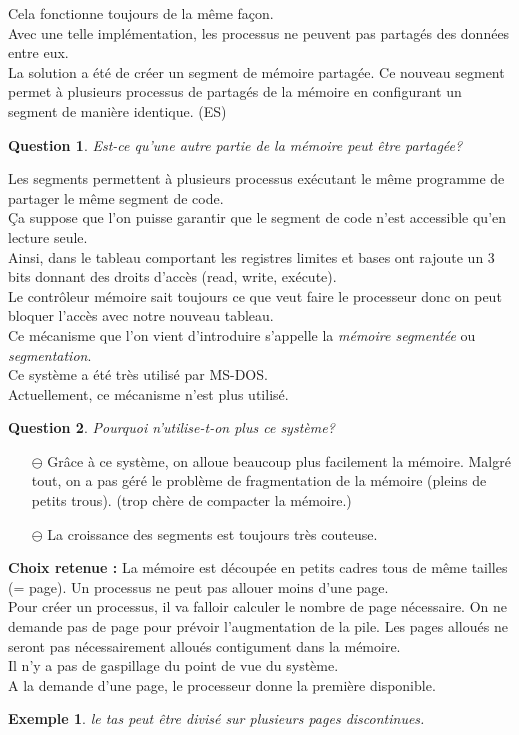 \documentclass[12pt,a4paper]{report}
\newtheorem*{ex}{Exemple}
\newtheorem*{q}{Question}
\begin{document}
Cela fonctionne toujours de la même façon.\\

Avec une telle implémentation, les processus ne peuvent pas partagés des données entre eux.\\
La solution a été de créer un segment de mémoire partagée. Ce nouveau segment permet à plusieurs processus de partagés de la mémoire en configurant un segment de manière identique. (ES)\\

\begin{q}Est-ce qu'une autre partie de la mémoire peut être partagée?\end{q}
Les segments permettent à plusieurs processus exécutant le même programme de partager le même segment de code.\\
Ça suppose que l'on puisse garantir que le segment de code n'est accessible qu'en lecture seule.\\
Ainsi, dans le tableau comportant les registres limites et bases ont rajoute un 3 bits donnant des droits d'accès (read, write, exécute).\\
Le contrôleur mémoire sait toujours ce que veut faire le processeur donc on peut bloquer l’accès avec notre nouveau tableau.\\


Ce mécanisme que l'on vient d'introduire s'appelle la \emph{mémoire segmentée} ou \emph{segmentation}.\\
Ce système a été très utilisé par MS-DOS.\\

Actuellement, ce mécanisme n'est plus utilisé.\\
\begin{q} Pourquoi n'utilise-t-on plus ce système?\end{q}
\begin{itemize}
\item[$\ominus$] Grâce à ce système, on alloue beaucoup plus facilement la mémoire. Malgré tout, on a pas géré le problème de fragmentation de la mémoire (pleins de petits trous). (trop chère de compacter la mémoire.)
\item[$\ominus$] La croissance des segments est toujours très couteuse.
\end{itemize}

\textbf{Choix retenue :} La mémoire est découpée en petits cadres tous de même tailles (= page). Un processus ne peut pas allouer moins d'une page.\\
Pour créer un processus, il va falloir calculer le nombre de page nécessaire. On ne demande pas de page pour prévoir l'augmentation de la pile. Les pages alloués ne seront pas nécessairement alloués contigument dans la mémoire.\\
Il n'y a pas de gaspillage du point de vue du système.\\
A la demande d'une page, le processeur donne la première disponible.
\begin{ex} le tas peut être divisé sur plusieurs pages discontinues. \end{ex}
\end{document}
